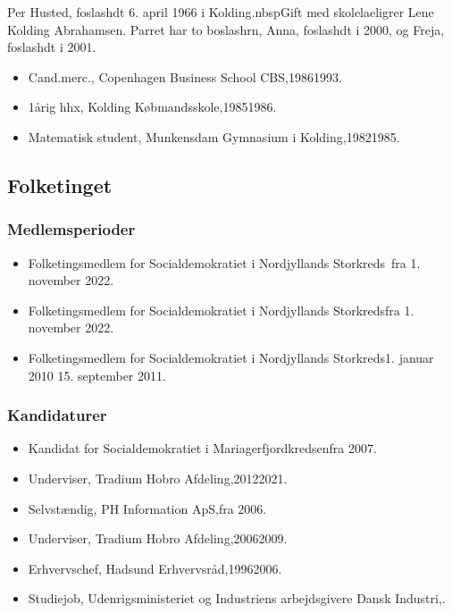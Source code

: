 \documentclass[11pt, a4paper]{awesome-cv}
\begin{document}
\makecvheader[R]
\makelettertitle
\begin{cvletter}
Per Husted, foslashdt 6. april 1966 i Kolding.nbspGift med skolelaeligrer Lene Kolding Abrahamsen. Parret har to boslashrn, Anna, foslashdt i 2000, og Freja, foslashdt i 2001.

\begin{itemize}
\item Cand.merc., Copenhagen Business School CBS,19861993.
\item 1årig hhx, Kolding Købmandsskole,19851986.
\item Matematisk student, Munkensdam Gymnasium i Kolding,19821985.
\end{itemize}
\subsection*{Folketinget}
\subsubsection*{Medlemsperioder}
\begin{itemize}
\item Folketingsmedlem for Socialdemokratiet i Nordjyllands Storkreds fra 1. november 2022.
\item Folketingsmedlem for Socialdemokratiet i Nordjyllands Storkredsfra 1. november 2022.
\item Folketingsmedlem for Socialdemokratiet i Nordjyllands Storkreds1. januar 2010  15. september 2011.
\end{itemize}
\subsubsection*{Kandidaturer}
\begin{itemize}
\item Kandidat for Socialdemokratiet i Mariagerfjordkredsenfra 2007.
\end{itemize}
\begin{itemize}
\item Underviser, Tradium Hobro Afdeling,20122021.
\item Selvstændig, PH Information ApS,fra 2006.
\item Underviser, Tradium Hobro Afdeling,20062009.
\item Erhvervschef, Hadsund Erhvervsråd,19962006.
\item Studiejob, Udenrigsministeriet og Industriens arbejdsgivere Dansk Industri,.
\end{itemize}
\end{cvletter}
\end{document}

